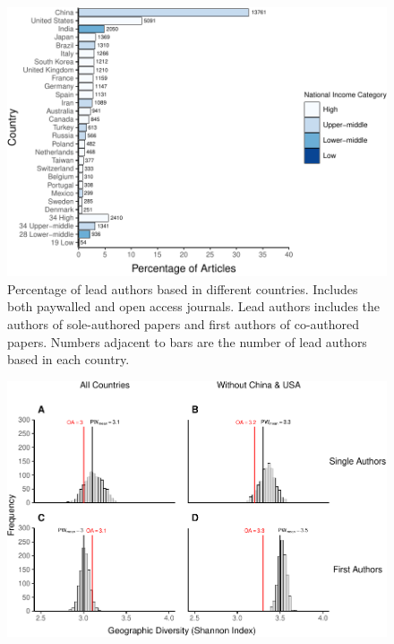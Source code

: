 \documentclass[english,man]{apa6}
\begin{document}
\begin{appendix}
\section{}
\begin{figure}

{\centering \includegraphics{Smith_etal_APC_ms_files/figure-latex/FigA1-1} 

}

\caption{Percentage of lead authors based in different countries. Includes both paywalled and open access journals. Lead authors includes the authors of sole-authored papers and first authors of co-authored papers. Numbers adjacent to bars are the number of lead authors based in each country.}\label{fig:FigA1}
\end{figure}

\begin{figure}

{\centering \includegraphics{Smith_etal_APC_ms_files/figure-latex/FigA2-1} 

}
\end{figure}
\end{appendix}
\end{document}
